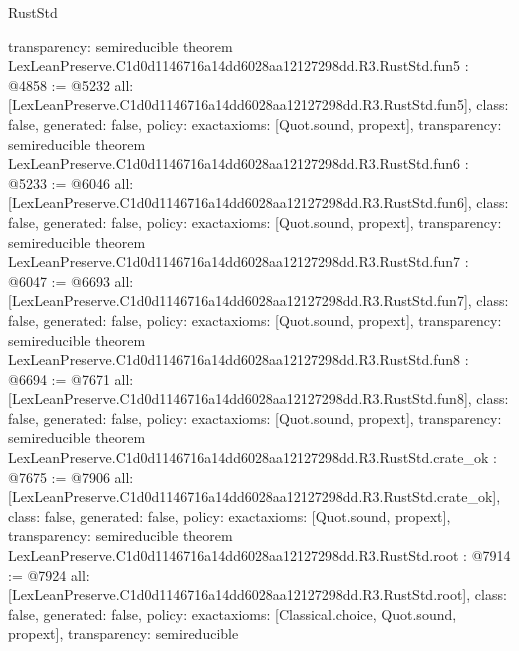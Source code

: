 \begin{lexlean}{RustStd}
\begin{coremodule}
{  transparency: semireducible
}
theorem LexLeanPreserve.C1d0d1146716a14dd6028aa12127298dd.R3.RustStd.fun5 : @4858 := @5232 {
  all: [LexLeanPreserve.C1d0d1146716a14dd6028aa12127298dd.R3.RustStd.fun5],
  class: false,
  generated: false,
  policy: exact{axioms: [Quot.sound, propext]},
  transparency: semireducible
}
theorem LexLeanPreserve.C1d0d1146716a14dd6028aa12127298dd.R3.RustStd.fun6 : @5233 := @6046 {
  all: [LexLeanPreserve.C1d0d1146716a14dd6028aa12127298dd.R3.RustStd.fun6],
  class: false,
  generated: false,
  policy: exact{axioms: [Quot.sound, propext]},
  transparency: semireducible
}
theorem LexLeanPreserve.C1d0d1146716a14dd6028aa12127298dd.R3.RustStd.fun7 : @6047 := @6693 {
  all: [LexLeanPreserve.C1d0d1146716a14dd6028aa12127298dd.R3.RustStd.fun7],
  class: false,
  generated: false,
  policy: exact{axioms: [Quot.sound, propext]},
  transparency: semireducible
}
theorem LexLeanPreserve.C1d0d1146716a14dd6028aa12127298dd.R3.RustStd.fun8 : @6694 := @7671 {
  all: [LexLeanPreserve.C1d0d1146716a14dd6028aa12127298dd.R3.RustStd.fun8],
  class: false,
  generated: false,
  policy: exact{axioms: [Quot.sound, propext]},
  transparency: semireducible
}
theorem LexLeanPreserve.C1d0d1146716a14dd6028aa12127298dd.R3.RustStd.crate_ok : @7675 := @7906 {
  all: [LexLeanPreserve.C1d0d1146716a14dd6028aa12127298dd.R3.RustStd.crate_ok],
  class: false,
  generated: false,
  policy: exact{axioms: [Quot.sound, propext]},
  transparency: semireducible
}
theorem LexLeanPreserve.C1d0d1146716a14dd6028aa12127298dd.R3.RustStd.root : @7914 := @7924 {
  all: [LexLeanPreserve.C1d0d1146716a14dd6028aa12127298dd.R3.RustStd.root],
  class: false,
  generated: false,
  policy: exact{axioms: [Classical.choice, Quot.sound, propext]},
  transparency: semireducible
}


\end{coremodule}
\end{lexlean}

